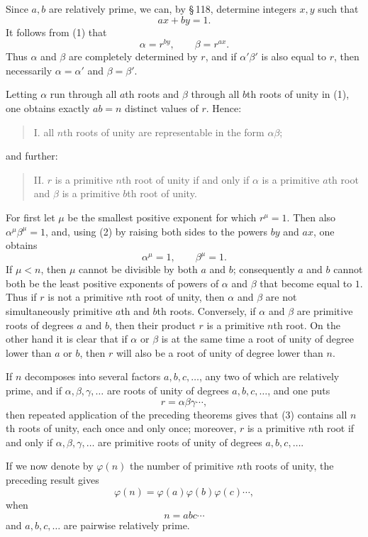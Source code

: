 \documentclass[11pt]{article}
\begin{document}
Since $a,b$ are relatively prime, we can, by \S\,118, determine integers $x,y$ such that
\[
\tag{2}        ax+by=1.
\]
It follows from (1) that
\[
        \alpha=r^{by},\qquad \beta=r^{ax}.
\]
Thus $\alpha$ and $\beta$ are completely determined by $r$, and if $\alpha'\beta'$ is also equal to $r$, then necessarily $\alpha=\alpha'$ and $\beta=\beta'$.

Letting $\alpha$ run through all $a$th roots and $\beta$ through all $b$th roots of unity in (1), one obtains exactly $ab=n$ distinct values of $r$. Hence:
\begin{quote}
I. all $n$th roots of unity are representable in the form $\alpha\beta$;
\end{quote}
and further:
\begin{quote}
II. $r$ is a primitive $n$th root of unity if and only if $\alpha$ is a primitive $a$th root and $\beta$ is a primitive $b$th root of unity.
\end{quote}
For first let $\mu$ be the smallest positive exponent for which $r^\mu=1$. Then also $\alpha^\mu\beta^\mu=1$, and, using (2) by raising both sides to the powers $by$ and $ax$, one obtains
\[
        \alpha^\mu=1,
        \qquad
        \beta^\mu=1.
\]
If $\mu<n$, then $\mu$ cannot be divisible by both $a$ and $b$; consequently $a$ and $b$ cannot both be the least positive exponents of powers of $\alpha$ and $\beta$ that become equal to $1$. Thus if $r$ is not a primitive $n$th root of unity, then $\alpha$ and $\beta$ are not simultaneously primitive $a$th and $b$th roots. Conversely, if $\alpha$ and $\beta$ are primitive roots of degrees $a$ and $b$, then their product $r$ is a primitive $n$th root. On the other hand it is clear that if $\alpha$ or $\beta$ is at the same time a root of unity of degree lower than $a$ or $b$, then $r$ will also be a root of unity of degree lower than $n$.

If $n$ decomposes into several factors $a,b,c,\ldots$, any two of which are relatively prime, and if $\alpha,\beta,\gamma,\ldots$ are roots of unity of degrees $a,b,c,\ldots$, and one puts
\[
\tag{3}        r=\alpha\beta\gamma\cdots,
\]
then repeated application of the preceding theorems gives that (3) contains all $n$th roots of unity, each once and only once; moreover, $r$ is a primitive $n$th root if and only if $\alpha,\beta,\gamma,\ldots$ are primitive roots of unity of degrees $a,b,c,\ldots$.

If we now denote by $\varphi(n)$ the number of primitive $n$th roots of unity, the preceding result gives
\[
\tag{4}        \varphi(n)=\varphi(a)\varphi(b)\varphi(c)\cdots,
\]
when
\[
        n=abc\cdots
\]
and $a,b,c,\ldots$ are pairwise relatively prime.
\end{document}
